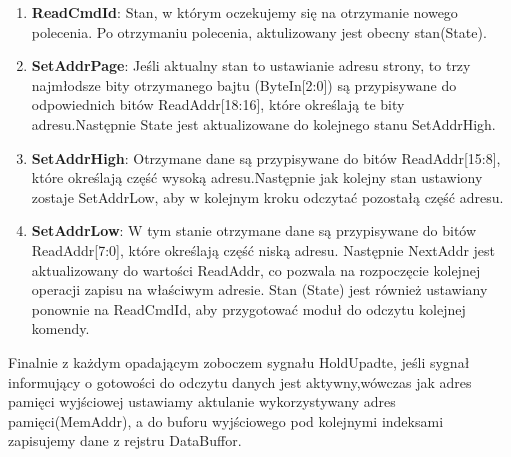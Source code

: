 \documentclass[12pt, a4paper]{article}
\begin{document}
\begin{enumerate}[label={\textbullet}]
    \item \textbf{\fontsize{12}{10}\selectfont ReadCmdId}: 
    Stan, w którym oczekujemy się na otrzymanie nowego polecenia. Po otrzymaniu 
    polecenia, aktulizowany jest obecny stan(State).

    \item \textbf{\fontsize{12}{10}\selectfont SetAddrPage}: 
    Jeśli aktualny stan to ustawianie adresu strony, to trzy najmłodsze bity otrzymanego bajtu (ByteIn[2:0]) są przypisywane do odpowiednich bitów ReadAddr[18:16], które określają te bity adresu.Następnie State jest aktualizowane do kolejnego stanu SetAddrHigh.

    \item \textbf{\fontsize{12}{10}\selectfont SetAddrHigh}:
     Otrzymane dane są przypisywane do bitów ReadAddr[15:8], które określają część wysoką adresu.Następnie jak kolejny stan ustawiony zostaje SetAddrLow, aby w kolejnym kroku odczytać pozostałą część adresu.
    
     \item \textbf{\fontsize{12}{10}\selectfont SetAddrLow}:
     W tym stanie otrzymane dane są przypisywane do bitów ReadAddr[7:0], które określają część niską adresu. Następnie NextAddr jest aktualizowany do wartości ReadAddr, co pozwala na rozpoczęcie kolejnej operacji zapisu na właściwym adresie. Stan (State) jest również ustawiany ponownie na ReadCmdId, aby przygotować moduł do odczytu kolejnej komendy.

\end{enumerate}

Finalnie z każdym opadającym zoboczem sygnału HoldUpadte, jeśli sygnał informujący o gotowości do odczytu danych jest aktywny,wówczas jak adres pamięci wyjściowej ustawiamy aktulanie wykorzystywany adres pamięci(MemAddr), a do buforu wyjściowego pod kolejnymi indeksami zapisujemy dane z rejstru DataBuffor.
\end{document}
